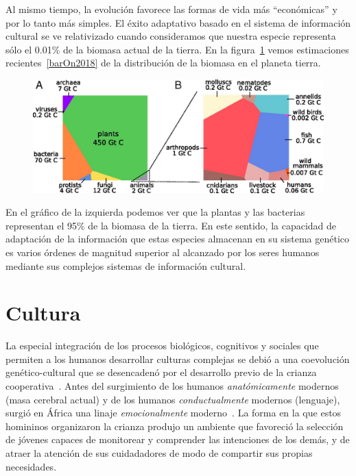 \documentclass[a4paper,10pt]{book}
\newif\ifes
\newcommand{\es}[1]{\ifes#1\fi}
\begin{document}

Al mismo tiempo, la evolución favorece las formas de vida más ``económicas'' y por lo tanto más simples.
El éxito adaptativo basado en el sistema de información cultural se ve relativizado cuando consideramos que nuestra especie representa sólo el 0.01\% de la biomasa actual de la tierra.
En la figura~\ref{fig:biomass} vemos estimaciones recientes~\ref{barOn2018} de la distribución de la biomasa en el planeta tierra.
\begin{figure}[ht!]
    \centering
    \includegraphics[width=0.7\linewidth]{static/biomass}
    \caption{
    \es{Distribución de la biomasa en el planeta tierra. }%
    }
    \label{fig:biomass}
\end{figure}
En el gráfico de la izquierda podemos ver que la plantas y las bacterias representan el 95\% de la biomasa de la tierra.
En este sentido, la capacidad de adaptación de la información que estas especies almacenan en su sistema genético es varios órdenes de magnitud superior al alcanzado por los seres humanos mediante sus complejos sistemas de información cultural.

\section{Cultura}

La especial integraci\'on de los procesos biol\'ogicos, cognitivos y sociales que permiten a los humanos desarrollar culturas complejas se debió a una coevolución genético-cultural que se desencadenó por el desarrollo previo de la crianza cooperativa~\cite{hrdy2020-emotionallyModern}.
Antes del surgimiento de los humanos \emph{anatómicamente} modernos (masa cerebral actual) y de los humanos \emph{conductualmente} modernos (lenguaje), surgió en África una linaje \emph{emocionalmente} moderno~\cite{hrdy2020-emotionallyModern}.
La forma en la que estos homininos organizaron la crianza produjo un ambiente que favoreció la selección de jóvenes capaces de monitorear y comprender las intenciones de los demás, y de atraer la atención de sus cuidadadores de modo de compartir sus propias necesidades.
\end{document}
